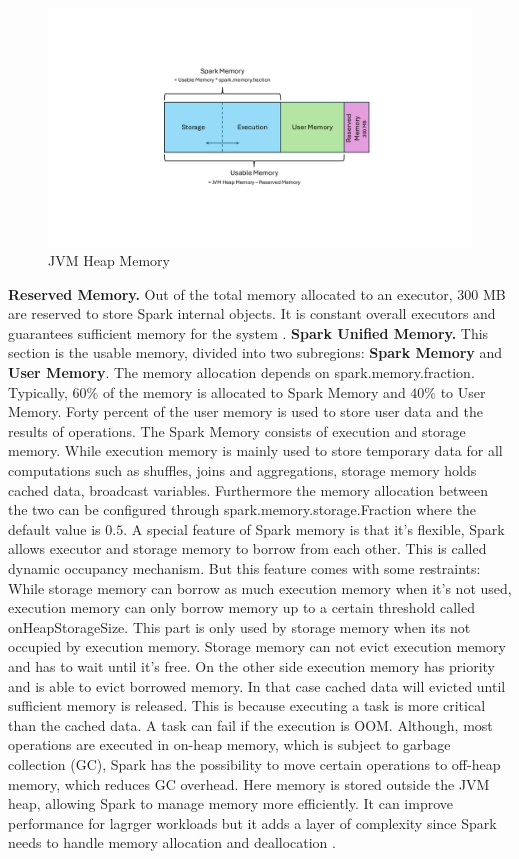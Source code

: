 \begin{figure}[ht]
    \centering
    \includegraphics[width=0.7\linewidth]{images/Spark_mem_man.pdf}
    \caption{JVM Heap Memory}
    \label{fig:spark-mem-man}
\end{figure}

\textbf{Reserved Memory.} Out of the total memory allocated to an executor, 300 MB are reserved to store Spark internal objects. It is constant overall executors and guarantees sufficient memory for the system \cite{apache_spark_configuration_2025}.
\textbf{Spark Unified Memory.} This section is the usable memory, divided into two subregions: \textbf{Spark Memory} and \textbf{User Memory}. The memory allocation depends on spark.memory.fraction. Typically, $60\%$ of the memory is allocated to Spark Memory and $40\%$ to User Memory. Forty percent of the user memory is used to store user data and the results of operations. The Spark Memory consists of execution and storage memory. While execution memory is mainly used to store temporary data for all computations such as shuffles, joins and aggregations, storage memory holds cached data, broadcast variables. Furthermore the memory allocation between the two can be configured through spark.memory.storage.Fraction where the default value is $0.5$. A special feature of Spark memory is that it's flexible, Spark allows executor and storage memory to borrow from each other. This is called dynamic occupancy mechanism. But this feature comes with some restraints: While storage memory can borrow as much execution memory when it's not used, execution memory can only borrow memory up to a certain threshold called onHeapStorageSize. This part is only used by storage memory when its not occupied by execution memory. Storage memory can not evict execution memory and has to wait until it's free. On the other side execution memory has priority and is able to evict borrowed memory. In that case cached data will evicted until sufficient memory is released. This is because executing a task is more critical than the cached data. A task can fail if the execution is OOM. Although, most operations are executed in on-heap memory, which is subject to garbage collection (GC), Spark has the possibility to move certain operations to off-heap memory, which reduces GC overhead. Here memory is stored outside the JVM heap, allowing Spark to manage memory more efficiently. It can improve performance for lagrger workloads but it adds a layer of complexity since Spark needs to handle memory allocation and deallocation \cite{chambers_spark_2018}\cite{apache_spark_tuning_2025}. 

